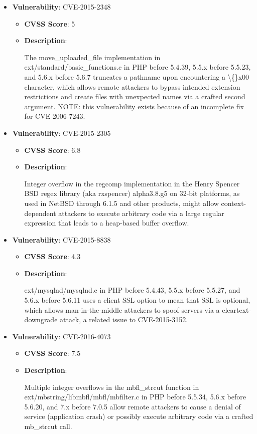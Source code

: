 \documentclass{article}
\begin{document}
\begin{itemize}
        \item \textbf{Vulnerability}: CVE-2015-2348
        \begin{itemize}
            \item \textbf{CVSS Score}:  5 
            \item \textbf{Description}:
            \parbox[t]{0.9\linewidth}{
                \ttfamily The move\_uploaded\_file implementation in ext/standard/basic\_functions.c in PHP before 5.4.39, 5.5.x before 5.5.23, and 5.6.x before 5.6.7 truncates a pathname upon encountering a \textbackslash\{\}x00 character, which allows remote attackers to bypass intended extension restrictions and create files with unexpected names via a crafted second argument.  NOTE: this vulnerability exists because of an incomplete fix for CVE-2006-7243.
            }
        \end{itemize}
    
        \item \textbf{Vulnerability}: CVE-2015-2305
        \begin{itemize}
            \item \textbf{CVSS Score}:  6.8 
            \item \textbf{Description}:
            \parbox[t]{0.9\linewidth}{
                \ttfamily Integer overflow in the regcomp implementation in the Henry Spencer BSD regex library (aka rxspencer) alpha3.8.g5 on 32-bit platforms, as used in NetBSD through 6.1.5 and other products, might allow context-dependent attackers to execute arbitrary code via a large regular expression that leads to a heap-based buffer overflow.
            }
        \end{itemize}
    
        \item \textbf{Vulnerability}: CVE-2015-8838
        \begin{itemize}
            \item \textbf{CVSS Score}:  4.3 
            \item \textbf{Description}:
            \parbox[t]{0.9\linewidth}{
                \ttfamily ext/mysqlnd/mysqlnd.c in PHP before 5.4.43, 5.5.x before 5.5.27, and 5.6.x before 5.6.11 uses a client SSL option to mean that SSL is optional, which allows man-in-the-middle attackers to spoof servers via a cleartext-downgrade attack, a related issue to CVE-2015-3152.
            }
        \end{itemize}
    
        \item \textbf{Vulnerability}: CVE-2016-4073
        \begin{itemize}
            \item \textbf{CVSS Score}:  7.5 
            \item \textbf{Description}:
            \parbox[t]{0.9\linewidth}{
                \ttfamily Multiple integer overflows in the mbfl\_strcut function in ext/mbstring/libmbfl/mbfl/mbfilter.c in PHP before 5.5.34, 5.6.x before 5.6.20, and 7.x before 7.0.5 allow remote attackers to cause a denial of service (application crash) or possibly execute arbitrary code via a crafted mb\_strcut call.
            }
        \end{itemize}
    

\end{itemize}
\end{document}
